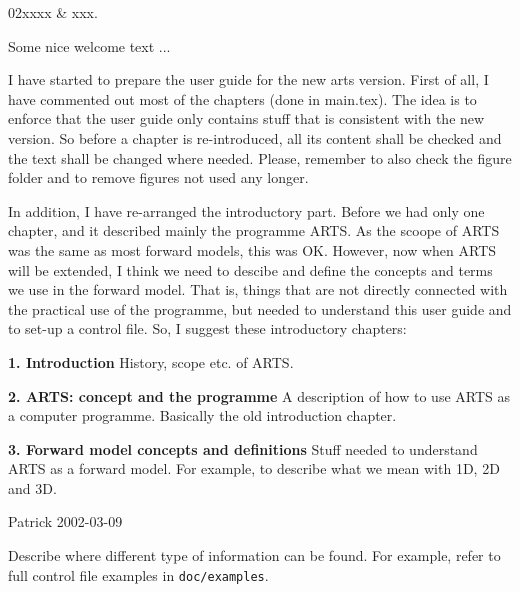 %
%
 \label{sec:intro}

%
%
\starthistory
  02xxxx & xxx.\\
\stophistory


Some nice welcome text ...


I have started to prepare the user guide for the new arts version.
First of all, I have commented out most of the chapters (done in main.tex). 
The idea is to enforce that the user guide only contains stuff that is 
consistent with the new version. So before a chapter is re-introduced, all
its content shall be checked and the text shall be changed where needed.
Please, remember to also check the figure folder and to remove figures
not used any longer. 

In addition, I have re-arranged the introductory part. Before we had
only one chapter, and it described mainly the programme ARTS. As the
scoope of ARTS was the same as most forward models, this was OK.
However, now when ARTS will be extended, I think we need to descibe
and define the concepts and terms we use in the forward model. That
is, things that are not directly connected with the practical use of
the programme, but needed to understand this user guide and to set-up
a control file. So, I suggest these introductory chapters:

{\bf 1. Introduction} History, scope etc. of ARTS.

{\bf 2. ARTS: concept and the programme} A description of how to use ARTS
as a computer programme. Basically the old introduction chapter.

{\bf 3. Forward model concepts and definitions} Stuff needed to
understand ARTS as a forward model. For example, to describe what we
mean with 1D, 2D and 3D.
 

Patrick 2002-03-09


\label{sec:intro:guide}

Describe where different type of information can be found. For
example, refer to full control file examples in \verb|doc/examples|.





